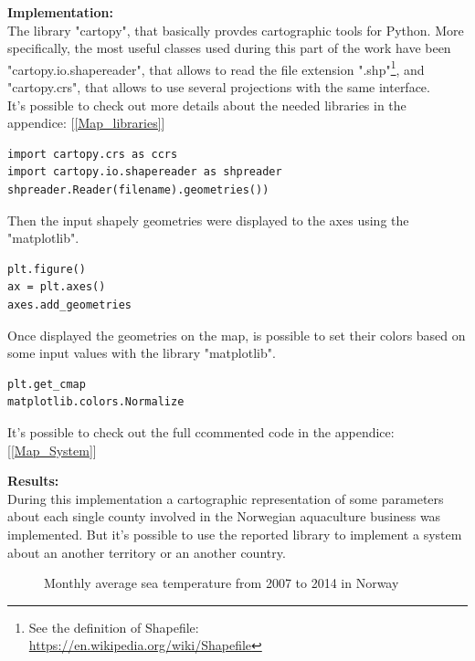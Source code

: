\textbf{Implementation:}\\
The library "cartopy", that basically provdes cartographic tools for Python. More specifically, the most useful classes used during this part of the work have been "cartopy.io.shapereader", that allows to read the file extension ".shp"\footnote{See the definition of Shapefile: \\ \url{https://en.wikipedia.org/wiki/Shapefile}}, and "cartopy.crs", that allows to use several projections with the same interface.\\
It's possible to check out more details about the needed libraries in the appendice: [\ref{Map_libraries}]
\begin{lstlisting}
import cartopy.crs as ccrs
import cartopy.io.shapereader as shpreader
shpreader.Reader(filename).geometries())
\end{lstlisting}

\newpage

Then the input shapely geometries were displayed  to the axes using the "matplotlib".
\begin{lstlisting}
plt.figure()
ax = plt.axes()
axes.add_geometries
\end{lstlisting}

Once displayed the geometries on the map, is possible to set their colors based on some input values with the library "matplotlib".
\begin{lstlisting}
plt.get_cmap
matplotlib.colors.Normalize
\end{lstlisting}

It's possible to check out the full ccommented code in the appendice: [\ref{Map_System}]

\textbf{Results:} \\
During this implementation a cartographic representation of some parameters about each single county involved in the Norwegian aquaculture business was implemented. But it's possible to use the reported library to implement a system about an another territory or an another country.
\begin{figure}[H]
    \caption{Monthly average sea temperature from 2007 to 2014 in Norway}
    \label{fig: Norway_averageSeaTemp}
\end{figure}
